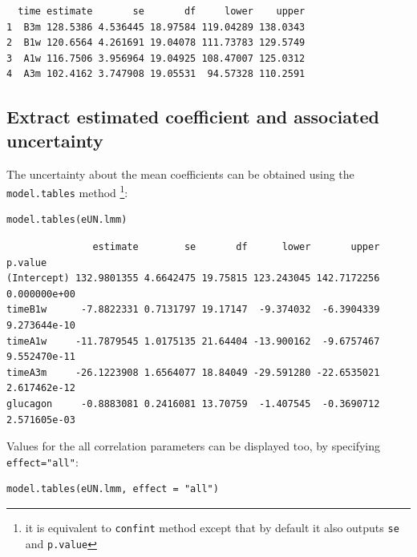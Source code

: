 \documentclass[12pt]{article}
\begin{document}
\begin{verbatim}
  time estimate       se       df     lower    upper
1  B3m 128.5386 4.536445 18.97584 119.04289 138.0343
2  B1w 120.6564 4.261691 19.04078 111.73783 129.5749
3  A1w 116.7506 3.956964 19.04925 108.47007 125.0312
4  A3m 102.4162 3.747908 19.05531  94.57328 110.2591
\end{verbatim}

\subsection{Extract estimated coefficient and associated uncertainty}
\label{sec:orgf27bd6f}

The uncertainty about the mean coefficients can be obtained using the
\texttt{model.tables} method \footnote{it is equivalent to \texttt{confint} method
except that by default it also outputs \texttt{se} and \texttt{p.value}}:
\lstset{language=r,label= ,caption= ,captionpos=b,numbers=none}
\begin{lstlisting}
model.tables(eUN.lmm)
\end{lstlisting}

\begin{verbatim}
               estimate        se       df      lower       upper      p.value
(Intercept) 132.9801355 4.6642475 19.75815 123.243045 142.7172256 0.000000e+00
timeB1w      -7.8822331 0.7131797 19.17147  -9.374032  -6.3904339 9.273644e-10
timeA1w     -11.7879545 1.0175135 21.64404 -13.900162  -9.6757467 9.552470e-11
timeA3m     -26.1223908 1.6564077 18.84049 -29.591280 -22.6535021 2.617462e-12
glucagon     -0.8883081 0.2416081 13.70759  -1.407545  -0.3690712 2.571605e-03
\end{verbatim}


Values for the all correlation parameters can be displayed
too, by specifying \texttt{effect="all"}:
\lstset{language=r,label= ,caption= ,captionpos=b,numbers=none}
\begin{lstlisting}
model.tables(eUN.lmm, effect = "all")
\end{lstlisting}
\end{document}
